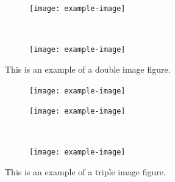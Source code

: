 \documentclass[12pt, letterpaper]{article}
\begin{document}
			\begin{figure}[!htb]
				\centering
				\begin{subfigure}{0.45\textwidth}
					\texttt{[image: example-image]}
					\caption{} %
					\label{fig:doubleImage:a}
				\end{subfigure}
				~
				\begin{subfigure}{0.45\textwidth}
					\texttt{[image: example-image]}
					\caption{} %
					\label{fig:doubleImage:b}
				\end{subfigure}
				\caption{This is an example of a double image figure.}
				\label{fig:doubleImage}
			\end{figure}

			\begin{figure}[!htb]
				\centering
				\hspace*{\fill}%
				\begin{subfigure}{0.45\textwidth}
					\texttt{[image: example-image]}
					\caption{} %
					\label{fig:tripleImage:a}
				\end{subfigure}
				\hspace*{\fill} %
				\par\vspace{1em}%
				\begin{subfigure}{0.45\textwidth}
					\texttt{[image: example-image]}
					\caption{} %
					\label{fig:tripleImage:b}
				\end{subfigure}
				~ %
				\begin{subfigure}{0.45\textwidth}
					\texttt{[image: example-image]}
					\caption{} %
					\label{fig:tripleImage:c}
				\end{subfigure}
				\caption{This is an example of a triple image figure.}
				\label{fig:tripleImage}
			\end{figure}
\end{document}
